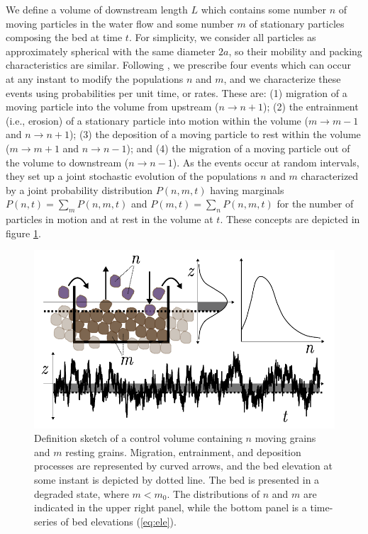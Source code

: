 \documentclass[draft]{agujournal2018}
\begin{document}
We define a volume of downstream length $L$ which contains some number $n$ of moving particles in the water flow and some number $m$ of stationary particles composing the bed at time $t$.
For simplicity, we consider all particles as approximately spherical with the same diameter $2a$, so their mobility and packing characteristics are similar.
Following \citet{Ancey2008}, we prescribe four events which can occur at any instant to modify the populations $n$ and $m$, and we characterize these events using probabilities per unit time, or rates.
These are: (1) migration of a moving particle into the volume from upstream ($n \rightarrow n+1$); (2) the entrainment (i.e., erosion) of a stationary particle into motion within the volume ($m\rightarrow m-1$ and $n\rightarrow n+1$); (3) the deposition of a moving particle to rest within the volume ($m\rightarrow m+1$ and $n\rightarrow n-1$); and (4) the migration of a moving particle out of the volume to downstream ($n\rightarrow n-1$).
As the events occur at random intervals, they set up a joint stochastic evolution of the populations $n$ and $m$ characterized by a joint probability distribution $P(n,m,t)$ having marginals $P(n,t) = \sum_m P(n,m,t)$ and $P(m,t) = \sum_n P(n,m,t)$ for the number of particles in motion and at rest in the volume at $t$.
These concepts are depicted in figure \ref{fig:concept}.
\begin{figure}
  \includegraphics[width=\linewidth,keepaspectratio]{./figures/definition-combo.pdf}
  \vspace{-1.0cm}
  \caption{Definition sketch of a control volume containing $n$ moving grains and $m$ resting grains. Migration, entrainment, and deposition processes are represented by curved arrows, and the bed elevation at some instant is depicted by dotted line. The bed is presented in a degraded state, where $m<m_0$. The distributions of $n$ and $m$ are indicated in the upper right panel, while the bottom panel is a time-series of bed elevations (\ref{eq:ele}).}
  \label{fig:concept}
\vspace{-0.75cm}
\end{figure}
\end{document}

